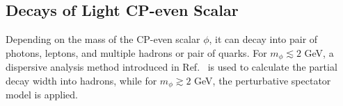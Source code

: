\documentclass[letterpaper,11pt]{article}
\begin{document}
\begin{description}
  \end{description}
  
\subsection{Decays of Light CP-even Scalar}
\label{sec:Hdecay}

 Depending on the mass of the CP-even scalar $\phi$, it can decay into pair of photons, leptons, and multiple hadrons or pair of quarks.  For $m_\phi \lesssim 2$ GeV,  a dispersive analysis method introduced in Ref.~\cite{Winkler:2018qyg} is used to calculate the partial decay width into hadrons, while for $m_\phi \gtrsim 2$ GeV, the perturbative spectator model is applied. 
\end{document}
